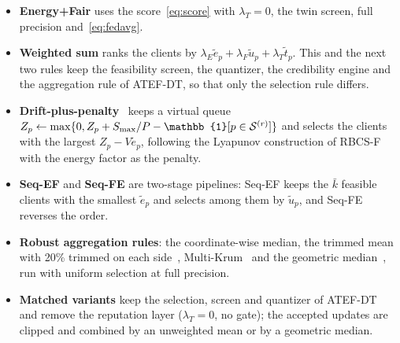 \begin{itemize}
	\item \textbf{Energy+Fair} uses the score~\eqref{eq:score} with $\lambda_T=0$, the twin screen, full precision and~\eqref{eq:fedavg}.

	\item {}\begin{revblock}\textbf{Weighted sum} ranks the clients by $\lambda_E\tilde e_p+\lambda_F\tilde u_p+\lambda_T\tilde t_p$. This and the next two rules keep the feasibility screen, the quantizer, the credibility engine and the aggregation rule of ATEF-DT, so that only the selection rule differs.\end{revblock}

	\item {}\begin{revblock}\textbf{Drift-plus-penalty}~\cite{huang2021efficiency} keeps a virtual queue $Z_p\leftarrow\max\{0,Z_p+S_{\max}/P-\mathbb{1}[p\in\cS^{(r)}]\}$ and selects the clients with the largest $Z_p-V\tilde e_p$, following the Lyapunov construction of RBCS-F with the energy factor as the penalty.\end{revblock}

	\item {}\begin{revblock}\textbf{Seq-EF} and \textbf{Seq-FE} are two-stage pipelines: Seq-EF keeps the $\bar k$ feasible clients with the smallest $\tilde e_p$ and selects among them by $\tilde u_p$, and Seq-FE reverses the order.\end{revblock}

	\item \textbf{Robust aggregation rules}: the coordinate-wise median, the trimmed mean with 20\% trimmed on each side~\cite{yin2018byzantine}, Multi-Krum~\cite{blanchard2017machine} and the geometric median~\cite{pillutla2022robust}, run with uniform selection at full precision.

	\item \textbf{Matched variants} keep the selection, screen and quantizer of ATEF-DT and remove the reputation layer ($\lambda_T=0$, no gate); the accepted updates are clipped and combined by an unweighted mean or by a geometric median.
\end{itemize}

